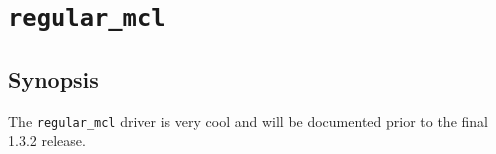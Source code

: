 \section{\tt regular\_mcl}
\label{sect:mcl_driver}

\subsection*{Synopsis}
The {\tt regular\_mcl} driver is very cool and will be documented prior to
the final 1.3.2 release.


